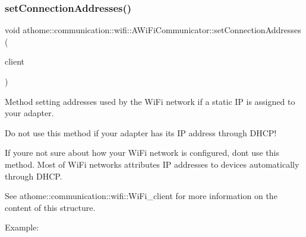 \subsubsection{\texorpdfstring{set\+Connection\+Addresses()}{setConnectionAddresses()}}
{\footnotesize\ttfamily void athome\+::communication\+::wifi\+::\+A\+Wi\+Fi\+Communicator\+::set\+Connection\+Addresses (\begin{DoxyParamCaption}\item[{const \mbox{\hyperlink{structathome_1_1communication_1_1wifi_1_1s__wifi__client}{Wi\+Fi\+\_\+client}} \&}]{client }\end{DoxyParamCaption})}

Method setting addresses used by the Wi\+Fi network if a static IP is assigned to your adapter.

Do not use this method if your adapter has its IP address through D\+H\+C\+P!

If you\textquotesingle{}re not sure about how your Wi\+Fi network is configured, don\textquotesingle{}t use this method. Most of Wi\+Fi networks attributes IP addresses to devices automatically through D\+H\+CP.

See athome\+::communication\+::wifi\+::\+Wi\+Fi\+\_\+client for more information on the content of this structure.

Example\+:


